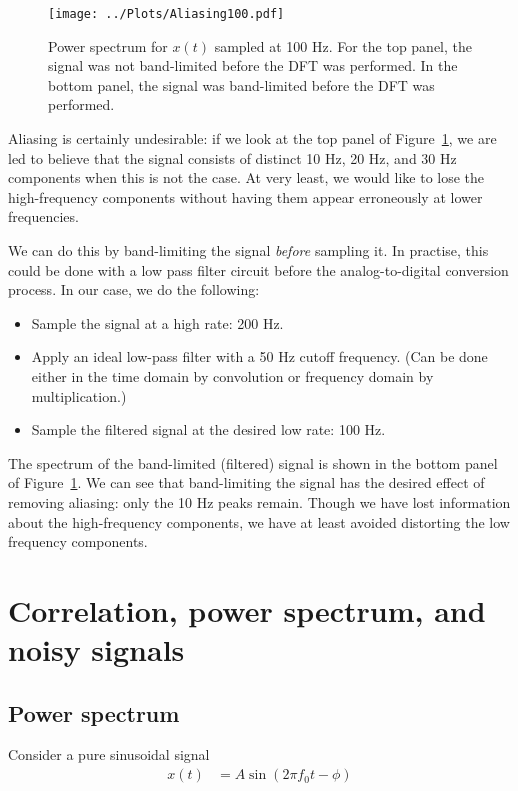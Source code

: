 \documentclass[twocolumn]{myarticle}
\begin{document}
\begin{figure}[ht]
    \centering
    \texttt{[image: ../Plots/Aliasing100.pdf]}
    \caption{Power spectrum for $ x(t) $ sampled at 100 Hz. For the top panel, the signal was not band-limited before the DFT was performed. In the bottom panel, the signal was band-limited before the DFT was performed.}
    \label{fig:aliasing100}
\end{figure}

Aliasing is certainly undesirable: if we look at the top panel of Figure~\ref{fig:aliasing100}, we are led to believe that the signal consists of distinct 10 Hz, 20 Hz, and 30 Hz components when this is not the case.
At very least, we would like to lose the high-frequency components without having them appear erroneously at lower frequencies.

We can do this by band-limiting the signal \emph{before} sampling it.
In practise, this could be done with a low pass filter circuit before the analog-to-digital conversion process.
In our case, we do the following:
\begin{itemize}
\item
    Sample the signal at a high rate: 200 Hz.
\item
    Apply an ideal low-pass filter with a 50 Hz cutoff frequency. (Can be done either in the time domain by convolution or frequency domain by multiplication.)
\item
    Sample the filtered signal at the desired low rate: 100 Hz.
\end{itemize}
The spectrum of the band-limited (filtered) signal is shown in the bottom panel of Figure~\ref{fig:aliasing100}.
We can see that band-limiting the signal has the desired effect of removing aliasing: only the 10 Hz peaks remain.
Though we have lost information about the high-frequency components, we have at least avoided distorting the low frequency components.

\section{Correlation, power spectrum, and noisy signals}
\label{sec:correlation_power_spectrum_and_noisy_signals}

\subsection{Power spectrum}
\label{subsec:power_spectrum2}

Consider a pure sinusoidal signal
\begin{align}
    x(t) &= A \sin(2 \pi f_0 t - \phi)
\end{align}
\end{document}
